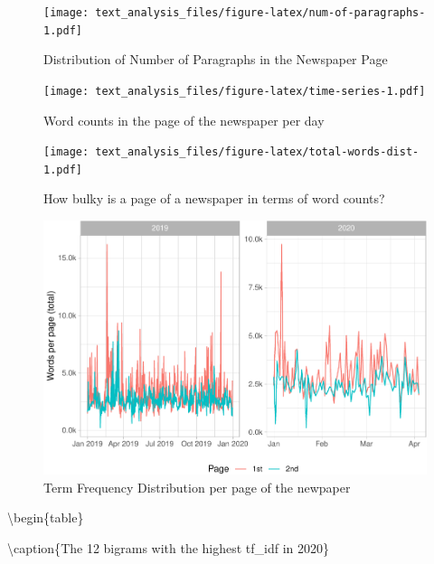 \documentclass[
  12pt,
]{article}
\begin{document}
\begin{figure}
\centering
\texttt{[image: text\_analysis\_files/figure-latex/num-of-paragraphs-1.pdf]}
\caption{\label{fig:num-of-paragraphs}Distribution of Number of Paragraphs in the Newspaper Page}
\end{figure}

\begin{figure}
\centering
\texttt{[image: text\_analysis\_files/figure-latex/time-series-1.pdf]}
\caption{\label{fig:time-series}Word counts in the page of the newspaper per day}
\end{figure}

\begin{figure}
\centering
\texttt{[image: text\_analysis\_files/figure-latex/total-words-dist-1.pdf]}
\caption{\label{fig:total-words-dist}How bulky is a page of a newspaper in terms of word counts?}
\end{figure}

\begin{figure}
\centering
\includegraphics{text_analysis_files/figure-latex/unnamed-chunk-2-1.pdf}
\caption{\label{fig:unnamed-chunk-2}Term Frequency Distribution per page of the newpaper}
\end{figure}

\textbackslash begin\{table\}

\textbackslash caption\{\label{tab:bigrams}The 12 bigrams with the highest tf\_idf in 2020\}
\centering
\end{document}
